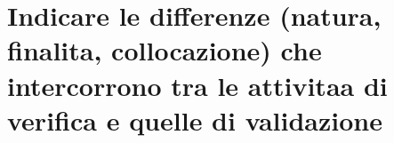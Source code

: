 \section{Indicare le differenze (natura, finalita, collocazione) che intercorrono tra le attivitaa di \textbf{verifica} e quelle di \textbf{validazione}}